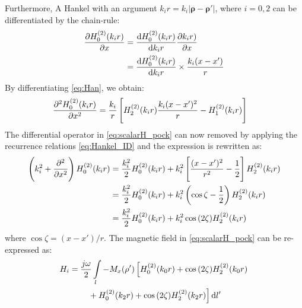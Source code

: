 \documentclass[12pt]{article}
\renewcommand{\v}[1]{\mathbf{#1}} %
\renewcommand{\O}{\omega}  %
\newcommand{\p}{\rho}  %
\newcommand{\x}{\times}  %
\renewcommand{\^}{\hat}  %
\newcommand*\diff{\mathop{}\!\mathrm{d}} %
\begin{document}
%
Furthermore, A Hankel with an argument $ k_i r = k_i|\v \p - \v \p'|$, where $i = 0,2$ can be differentiated by the chain-rule:
%
\begin{equation}
  \begin{split}
    \pdv{H_0^{(2)}(k_i r)}{x} &= \dv{H_0^{(2)}(k_i r)}{k_i r} \pdv{k_i r)}{x} \\
    &= \dv{H_0^{(2)}(k_i r)}{k_i r} \x \frac{k_i (x - x')}{r}
  \end{split}
  \label{eq:Han}
\end{equation}
%
By differentiating \eqref{eq:Han}, we obtain:
%
\begin{align}
  \pdv[2]{H_0^{(2)}(k_i r)}{x} &= \frac{k_i}{r} \left[H_2^{(2)}(k_i r) \frac{k_i (x - x')^2}{r} - H_1^{(2)}(k_i r) \right]
  \label{eq:difHan}
\end{align}
%
The differential operator in \eqref{eq:scalarH_pock} can now removed by applying the recurrence relations \eqref{eq:Hankel_ID} and the expression is rewritten as:
%
\begin{equation}
  \begin{split}
    \left(k_i^2 + \pdv[2]{}{x} \right) H_0^{(2)}(k_i r) &= \frac{k_i^2}{2} H_0^{(2)}(k_i r) + k_i^2 \left[ \frac{(x-x')^2}{r^2} - \frac{1}{2} \right] H_2^{(2)}(k_i r) \\
    &= \frac{k_i^2}{2} H_0^{(2)}(k_i r) + k_i^2 \left( \cos \zeta - \frac{1}{2} \right) H_2^{(2)}(k_i r) \\
    &= \frac{k_i^2}{2} H_0^{(2)}(k_i r) + k_i^2 \cos {(2\zeta)} H_2^{(2)}(k_i r)
  \end{split}
  \label{eq:Hankel_final}
\end{equation}
%
where $\cos \zeta = {(x-x')/r}$. The magnetic field in \eqref{eq:scalarH_pock} can be re-expressed as:
%
\begin{align}
  H_i &=  \frac{j \O}{2} \int\limits_{l} -M_x(\v \p') \left[ H_0^{(2)}(k_0 r) + \cos {(2 \zeta)} H_2^{(2)}(k_0 r) \right. \notag\\
  &\qquad \left. {} + H_0^{(2)}(k_2 r) + \cos {(2\zeta)} H_2^{(2)}(k_2 r)\right]\diff{l'}
  \label{eq:H_final}
\end{align}
\end{document}
